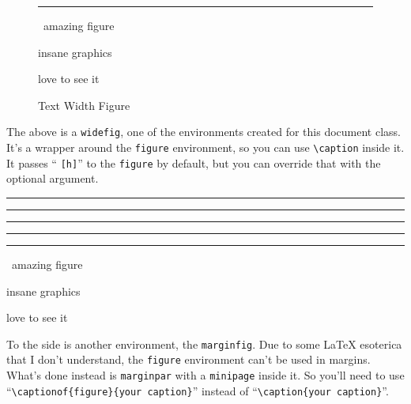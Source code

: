 \begin{chapterpage}
  \vfill
  \begin{figure}[h]
    \hrulefill\vskip1pt%
    {\color{gray5}\rule{\textwidth}{+1cm\relax}}%
    \vspace*{\dimexpr-47pt-1cm\relax}

    {\color{white}
    \ amazing figure\hfill\vskip0.5cm{\centering insane graphics\par}\vskip0.5cm\hfill love to see it\ \hbox{}\vskip1pt}\hrulefill
    \caption[Text Width Figure]{\color{gray3}Text Width Figure}
  \end{figure}
\end{chapterpage}

\noindent
The above is a \texttt{widefig}, one of the environments created for this document class.
It's a wrapper around the \texttt{figure} environment, so you can use \verb|\caption| inside it.
It passes ``\kern -1pt \texttt{[h]}\kern -1pt'' to the \texttt{figure} by default, but you can override that with the optional argument.

\begin{widefig}[t]%
  {\color{gray9}
  \rule{\widefigwidth\relax}{30ex}\hfill\color{gray7}
  \rule{\widefigwidth\relax}{30ex}\hfill\color{gray5}
  \rule{\widefigwidth\relax}{30ex}\hfill\color{gray3}
  \rule{\widefigwidth\relax}{30ex}%
}
  \vskip1pt
  \hrulefill
\end{widefig}

\begin{marginfig}
  \hrulefill\vskip1pt%
  {\color{gray8}\rule{\textwidth}{+5cm\relax}}%
  \vspace*{\dimexpr-47pt-5cm\relax}

  \ amazing figure\hfill\vskip2.5cm{\centering insane graphics\par}\vskip2.5cm\hfill love to see it\ \hbox{}\vskip1pt\hrulefill
\end{marginfig}

To the side is another environment, the \texttt{marginfig}.
Due to some \LaTeX{} esoterica that I don't understand, the \texttt{figure} environment can't be used in margins.
What's done instead is \texttt{marginpar} with a \texttt{minipage} inside it.
So you'll need to use ``\verb|\captionof{figure}{your caption}|'' instead of ``\verb|\caption{your caption}|''.

